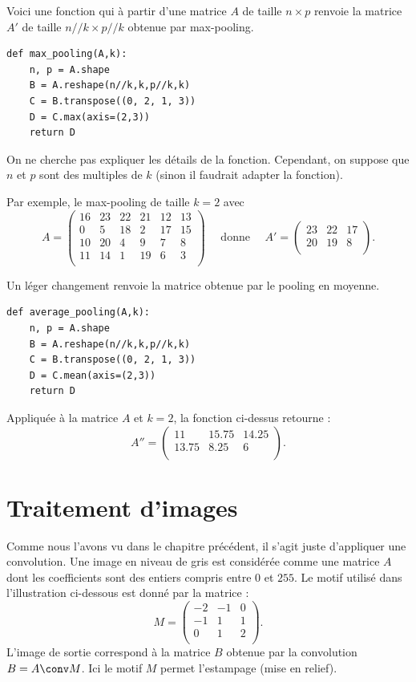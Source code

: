 \documentclass[11pt,class=report,crop=false]{standalone}
\begin{document}

Voici une fonction  qui à partir d'une matrice $A$ de taille $n \times p$ renvoie la matrice $A'$ de taille $n//k \times p //k$ obtenue par max-pooling. 

\begin{lstlisting}
def max_pooling(A,k):
    n, p = A.shape
    B = A.reshape(n//k,k,p//k,k)
    C = B.transpose((0, 2, 1, 3))
    D = C.max(axis=(2,3))
    return D
\end{lstlisting}

On ne cherche pas expliquer les détails de la fonction. Cependant, on suppose que $n$ et $p$ sont des multiples de $k$ (sinon il faudrait adapter la fonction).


Par exemple, le max-pooling de taille $k=2$ avec
$$A = \begin{pmatrix}
16 & 23 & 22 & 21 & 12 & 13 \\
 0 & 5  & 18 & 2  & 17 & 15 \\
10 & 20 & 4  & 9  & 7  & 8 \\
11 & 14 & 1  & 19 & 6  & 3 \\
\end{pmatrix}
\quad \text{ donne } \quad
A' = \begin{pmatrix}
23 & 22 & 17 \\
20 & 19 & 8 \\
\end{pmatrix}.$$

Un léger changement renvoie la matrice obtenue par le pooling en moyenne.
\begin{lstlisting}
def average_pooling(A,k):
    n, p = A.shape
    B = A.reshape(n//k,k,p//k,k)
    C = B.transpose((0, 2, 1, 3))
    D = C.mean(axis=(2,3))
    return D
\end{lstlisting}
Appliquée à la matrice $A$ et $k=2$, la fonction ci-dessus retourne : 
$$A'' = 
\begin{pmatrix}
11    & 15.75 & 14.25 \\
13.75 & 8.25  & 6 \\
\end{pmatrix}.$$


\section{Traitement d'images}

Comme nous l'avons vu dans le chapitre précédent, il s'agit juste d'appliquer une convolution. Une image en niveau de gris est considérée comme une matrice $A$ dont les coefficients sont des entiers compris entre $0$ et $255$. Le motif utilisé dans l'illustration ci-dessous est donné par la matrice :
$$M = 
\begin{pmatrix}
-2&-1&0\\
-1&1&1\\
0&1&2\\
\end{pmatrix}.$$
L'image de sortie correspond à la matrice $B$ obtenue par la convolution $B = A \conv M$.
Ici le motif $M$ permet l'estampage (mise en relief).
\end{document}
